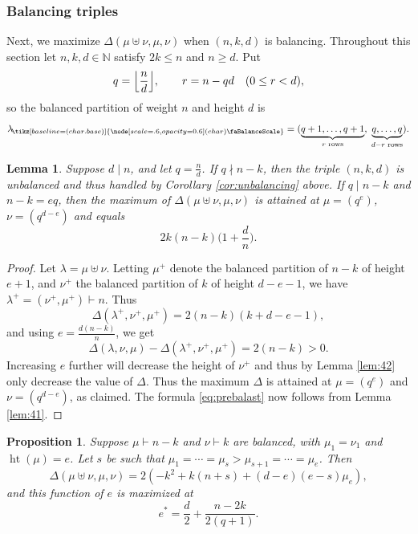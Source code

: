\documentclass[12pt,dvipsnames,accepted=2016-08-18,a4paper,onecolumn]{quantumarticle}
\def\la{\lambda}
\DeclareMathOperator{\het}{ht}
\def\la{\lambda}
\def\bal{\tikz[baseline=(char.base)]{
  \node[scale=.6,opacity=0.6] (char) {\faBalanceScale}}
}
\def\lab{\lambda_{\!\bal}}
\numberwithin{equation}{section}
\newcommand{\N}{\mathbb N}
\newtheorem{lemma}[theorem]{Lemma}
\newtheorem{proposition}[theorem]{Proposition}
\theoremstyle{definition}
\begin{document}
\subsubsection{Balancing triples}

Next, we 
maximize $\Delta(\mu\uplus\nu,\mu,\nu)$ when $(n,k,d)$ is balancing. 
Throughout this section let $n,k,d\in\N$ satisfy 
$2k\le n$ and $n\ge d$.  
Put  
\begin{equation}\label{eq:qr}
  q=\Bigl\lfloor\frac{n}{d}\Bigr\rfloor,\qquad
  r=n-qd\quad(0\le r<d),
\end{equation}
so the balanced partition of weight $n$ and height $d$ is  
\[
  \lab=(\underbrace{q+1,\dots ,q+1}_{r\text{ rows}},\;
           \underbrace{q,\dots ,q}_{d-r\text{ rows}}).
\]

\begin{lemma}\label{lem:prebalast}
Suppose $d \mid n$, and let $q=\frac nd$. 
If $q \nmid n-k $, then the triple $(n,k,d)$ is unbalanced and thus handled by Corollary \ref{cor:unbalancing} above.
If $q\mid n-k$ and $n-k=eq$, then 
the maximum of $\Delta(\mu\uplus\nu,\mu,\nu)$ is
attained at $\mu=(q^e)$, $\nu=(q^{d-e})$ and equals
\begin{equation}\label{eq:prebalast}
    2 k (n-k) \Big(1+\frac dn\Big). 
\end{equation}
\end{lemma}

\begin{proof}
Let $\lambda=\mu\uplus\nu$. 
Letting $\mu^+$ denote the balanced partition of $n-k$ of height $e+1$, and $\nu^+$ the balanced partition of $k$ of height $d-e-1$, we have $\la^+=(\nu^+,\mu^+)\vdash n$. Thus
\[
    \Delta(\la^+,\nu^+,\mu^+) = 2(n-k)(k+d-e-1),
\]
and using $e=\frac{d(n-k)}n$, we get
\[
    \Delta(\la,\nu,\mu)-\Delta(\la^+,\nu^+,\mu^+) = 2 (n-k) >0.
\]
Increasing $e$ further will decrease the height of $\nu^+$ and thus by Lemma \ref{lem:42} only decrease the value of $\Delta$. Thus the maximum $\Delta$ is attained at 
$\mu=(q^e)$ and $\nu=(q^{d-e})$, as claimed. The formula \eqref{eq:prebalast} now follows from Lemma \ref{lem:41}.
\end{proof}



\begin{proposition}\label{prop:sth}
Suppose $\mu\vdash n-k$ and $\nu\vdash k$ are balanced, 
with $\mu_1=\nu_1$ and 
$\het(\mu)=e$.
Let $s$ be such that $\mu_1=\cdots=\mu_s>\mu_{s+1}=\cdots=\mu_e$. 
Then 
\begin{equation}\label{eq:deltaS}
    \Delta(\mu\uplus\nu,\mu,\nu) = 
2 (-k^2 + k (n + s) + (d - e) (e-s) \mu_e),
\end{equation}
and this function of $e$ is maximized at
\begin{equation*}
    e^* = \frac{d}{2} + \frac{n-2k}{2(q+1)}.
\end{equation*}
\end{proposition}
\end{document}
